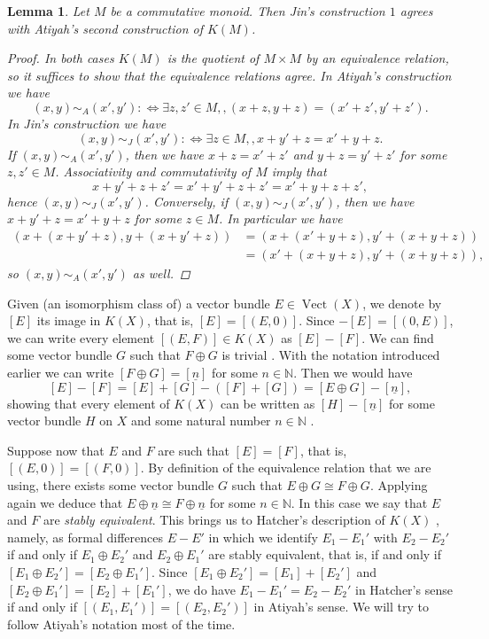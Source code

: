 \documentclass[12pt,a4paper]{amsart}
\theoremstyle{plain}
\newtheorem{lm}[thm]{Lemma}
\theoremstyle{definition}
\theoremstyle{remark}
\begin{document}
\begin{lm}
  Let $M$ be a commutative monoid.
  Then Jin's construction $1$ agrees with Atiyah's second construction of $K(M)$.
  \begin{proof}
    In both cases $K(M)$ is the quotient of $M \times M$ by an equivalence relation, so it suffices to show that the equivalence relations agree.
    In Atiyah's construction we have
    \[ (x,y) \sim_{A} (x', y') : \Leftrightarrow \exists z , z' \in M,, (x + z, y + z) = (x' + z', y' + z'). \]
    In Jin's construction we have
    \[ (x,y) \sim_{J} (x', y') : \Leftrightarrow \exists z \in M,, x + y' + z = x' + y + z. \]
    If $(x, y) \sim_{A} (x', y')$, then we have $x + z = x' + z'$ and $y + z = y' + z'$ for some $z, z' \in M$. 
    Associativity and commutativity of $M$ imply that
    \[ x + y' + z + z' = x' + y' + z + z' = x' + y + z + z', \]
    hence $(x, y) \sim_{J} (x', y')$.
    Conversely, if $(x, y) \sim_{J} (x', y')$, then we have $x + y' + z = x' + y + z$ for some $z \in M$.
    In particular we have
    \begin{align*}
      (x + (x + y' + z), y + (x + y' + z)) & = (x + (x' + y + z), y' + (x + y + z)) \\
      & = (x' + (x + y + z), y' + (x + y + z)),
    \end{align*}
    so $(x, y) \sim_{A} (x', y')$ as well.
  \end{proof}
\end{lm}

Given (an isomorphism class of) a vector bundle $E \in \operatorname{Vect}(X)$, we denote by $[E]$ its image in $K(X)$, that is, $[E] = [(E, 0)]$.
Since $-[E] = [(0,E)]$, we can write every element $[(E,F)] \in K(X)$ as $[E] - [F]$.
We can find some vector bundle $G$ such that $F \oplus G$ is trivial \cite[Corollary 1.4.14]{ati67}.
With the notation introduced earlier we can write $[F \oplus G] = [\underline{n}]$ for some $n \in \mathbb{N}$.
Then we would have
\[ [E] - [F] = [E] + [G] - ([F] + [G]) = [E \oplus G] - [\underline{n}], \]
showing that every element of $K(X)$ can be written as $[H] - [\underline{n}]$ for some vector bundle $H$ on $X$ and some natural number $n \in \mathbb{N}$ \cite[p.~44]{ati67}.

Suppose now that $E$ and $F$ are such that $[E] = [F]$, that is, $[(E,0)] = [(F,0)]$.
By definition of the equivalence relation that we are using, there exists some vector bundle $G$ such that $E \oplus G \cong F \oplus G$.
Applying \cite[Corollary 1.4.14]{ati67} again we deduce that $E \oplus \underline{n} \cong F \oplus \underline{n}$ for some $n \in \mathbb{N}$.
In this case we say that $E$ and $F$ are \textit{stably equivalent}.
This brings us to Hatcher's description of $K(X)$ \cite[p.~39]{hat03}, namely, as formal differences $E - E'$ in which we identify $E_{1} - E_{1}'$ with $E_{2} - E_{2}'$ if and only if $E_{1} \oplus E_{2}'$ and $E_{2} \oplus E_{1}'$ are stably equivalent, that is, if and only if $[E_{1} \oplus E_{2}'] = [E_{2} \oplus E_{1}']$.
Since $[E_{1} \oplus E_{2}'] = [E_{1}] + [E_{2}']$ and $[E_{2} \oplus E_{1}'] = [E_{2}] + [E_{1}']$, we do have $E_{1} - E_{1}' = E_{2} - E_{2}'$ in Hatcher's sense if and only if $[(E_{1},E_{1}')] = [(E_{2},E_{2}')]$ in Atiyah's sense.
We will try to follow Atiyah's notation most of the time.



\vfill
\end{document}
